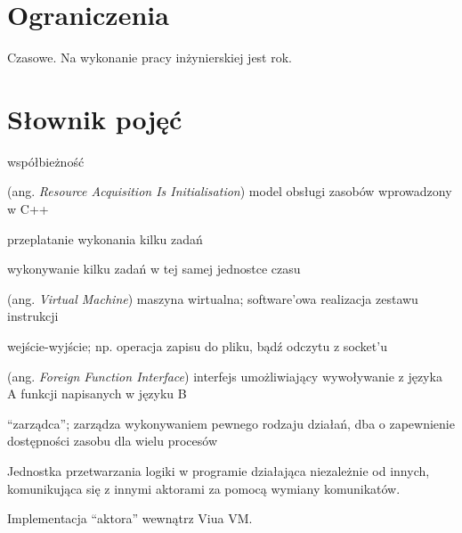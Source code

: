 \documentclass[11pt,oneside,a4paper,titlepage,onecolumn]{article}
\begin{document}
\section{Ograniczenia}

Czasowe. Na wykonanie pracy inżynierskiej jest rok.

\newpage
\section{Słownik pojęć}

\begin{labeling}{współbieżność}
\item [RAII] (ang. \emph{Resource Acquisition Is Initialisation}) model obsługi zasobów wprowadzony w C++
\item [współbieżność] przeplatanie wykonania kilku zadań
\item [równoległość] wykonywanie kilku zadań w tej samej jednostce czasu
\item [VM] (ang. \emph{Virtual Machine}) maszyna wirtualna; software'owa realizacja zestawu instrukcji
\item [I/O] wejście-wyjście; np. operacja zapisu do pliku, bądź odczytu z socket'u
\item [FFI] (ang. \emph{Foreign Function Interface}) interfejs umożliwiający wywoływanie z języka A funkcji
    napisanych w języku B
\item [scheduler] ``zarządca''; zarządza wykonywaniem pewnego rodzaju działań, dba o zapewnienie dostępności
    zasobu dla wielu procesów
\item [aktor] Jednostka przetwarzania logiki w programie działająca niezależnie od innych, komunikująca się z
    innymi aktorami za pomocą wymiany komunikatów.
\item [proces] Implementacja ``aktora'' wewnątrz Viua VM.
\end{labeling}
\end{document}
